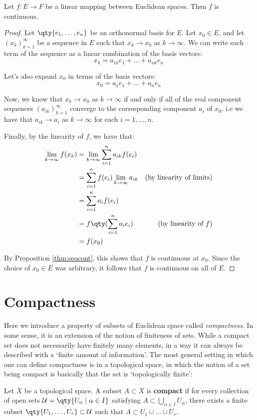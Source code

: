  \begin{theorem}
   Let \( f:E\to F \) be a linear mapping between Euclidean spaces. Then \( f \) is continuous.
 \end{theorem}
 \begin{proof}
   Let \( \qty{e_1,\dots, e_n} \) be an orthonormal basis for \( E \). Let \( x_0\in E \), and let \( (x_k)_{k=1}^\infty \) be a sequence in \( E \) such that \( x_k\to x_0 \) as \( k\to\infty \). We can write each term of the sequence as a linear combination of the basis vectors:
   \[ x_k=a_{1k}e_1+\dots+a_{nk}e_n \]

   Let's also expand \( x_0 \) in terms of the basis vectors:
   \[ x_0=a_1e_1+\dots+a_ne_n \]

   Now, we know that \( x_k\to x_0 \) as \( k\to\infty \) if and only if all of the real component sequences \( (a_{ik})_{k=1}^\infty \) converge to the corresponding component \( a_i \) of \( x_0 \), i.e we have that \( a_{ik}\to a_i \) as \( k\to\infty \) for each \( i=1,\dots,n \).

   \vspace{3mm}

   Finally, by the linearity of \( f \), we have that:
   \begin{align*}
     \lim_{k\to\infty}f(x_k)&= \lim_{k\to\infty}\sum_{i=1}^n a_{ik}f(e_i)\\
     &= \sum_{i=1}^n f(e_i)\lim_{k\to\infty} a_{ik} &(\text{by linearity of limits})\\
     &= \sum_{i=1}^n a_i f(e_i)\\
     &= f\qty(\sum_{i=1}^n a_ie_i) &(\text{by linearity of }f)\\
     &= f(x_0)
   \end{align*}

   By Proposition \ref{thm:seqcont}, this shows that \( f \) is continuous at \( x_0 \). Since the choice of \( x_0\in E \) was arbitrary, it follows that \( f \) is continuous on all of \( E \).
 \end{proof}

 \section{Compactness}
 Here we introduce a property of subsets of Euclidean space called \emph{compactness}. In some sense, it is an extension of the notion of finiteness of sets. While a compact set does not necessarily have finitely many elements, in a way it can always be described with a `finite amount of information'. The most general setting in which one can define compactness is in a topological space, in which the notion of a set being compact is basically that the set is `topologically finite':
 \begin{definition}
   Let \( X \) be a topological space. A subset \( A\subset X \) is \textbf{compact} if for every collection of open sets \( \mathcal{U}=\qty{U_\alpha\mid \alpha\in I} \) satisfying \( A\subset\bigcup_{\alpha\in I}U_\alpha \), there exists a finite subset \( \qty{U_1,\dots,U_r}\subset\mathcal{U} \) such that \( A\subset U_1\cup\dots\cup U_r \).
 \end{definition}

